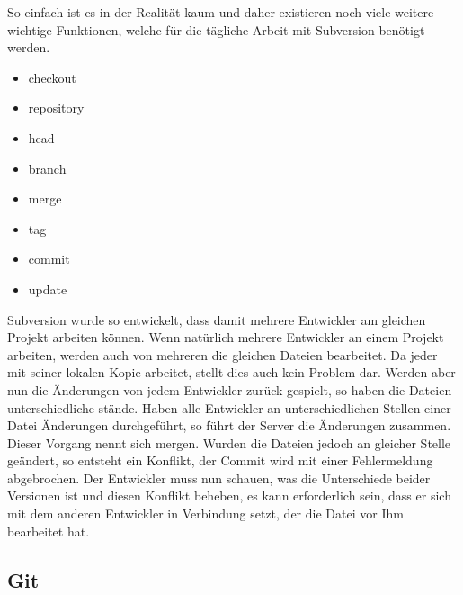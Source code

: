 So einfach ist es in der Realität kaum und daher existieren noch viele weitere wichtige Funktionen, welche für die tägliche Arbeit mit Subversion benötigt werden.

\begin{itemize}
\itemsep-8pt
\item checkout
\item repository
\item head
\item branch
\item merge
\item tag
\item commit
\item update
\end{itemize}

Subversion wurde so entwickelt, dass damit mehrere Entwickler am gleichen Projekt arbeiten können. Wenn natürlich mehrere Entwickler an einem Projekt arbeiten, werden auch von mehreren die gleichen Dateien bearbeitet. Da jeder mit seiner lokalen Kopie arbeitet, stellt dies auch kein Problem dar. Werden aber nun die Änderungen von jedem Entwickler zurück gespielt, so haben die Dateien unterschiedliche stände. Haben alle Entwickler an unterschiedlichen Stellen einer Datei Änderungen durchgeführt, so führt der Server die Änderungen zusammen. Dieser Vorgang nennt sich mergen. Wurden die Dateien jedoch an gleicher Stelle geändert, so entsteht ein Konflikt, der Commit wird mit einer Fehlermeldung abgebrochen.
Der Entwickler muss nun schauen, was die Unterschiede beider Versionen ist und diesen Konflikt beheben, es kann erforderlich sein, dass er sich mit dem anderen Entwickler in Verbindung setzt, der die Datei vor Ihm bearbeitet hat.

\subsection{Git}

